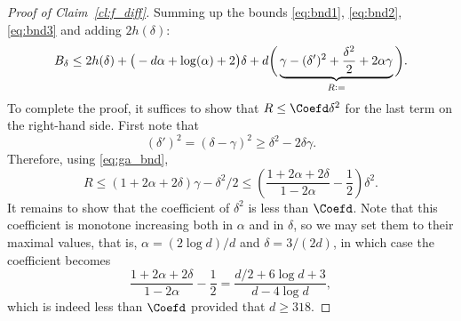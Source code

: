 \documentclass[12pt]{amsart}
\theoremstyle{definition}
\newcommand\al{\alpha}
\newcommand\ga{\gamma}
\newcommand\de{\delta}
\newcommand{\defeq}{\mathrel{\vcenter{\baselineskip0.5ex \lineskiplimit0pt
                     \hbox{\scriptsize.}\hbox{\scriptsize.}}}%
                     =}
\begin{document}
\begin{proof}[Proof of Claim~\ref{cl:f_diff}]
Summing up the bounds \eqref{eq:bnd1}, \eqref{eq:bnd2}, \eqref{eq:bnd3} and adding $2 h(\de)$:
%
\[ B_\de 
\leq 2 h(\de) 
+ \big( -d\al + \log(\al) + 2 \big) \de 
+ d\bigg( 
\underbrace{\ga -(\de')^2 + \frac{\de^2}{2} + 2\al\ga}_
{R \defeq} \bigg) .\]
%
To complete the proof, it suffices to show that $R \leq \Coefd \de^2$ for the last term on the right-hand side. First note that 
%
\[ (\de')^2 = (\de-\ga)^2 \geq \de^2 - 2\de \ga .\]
%
Therefore, using \eqref{eq:ga_bnd}, 
%
\[ R \leq (1+2\al+2\de) \ga - \de^2/2 
\leq \left( \frac{1+2\al+2\de}{1-2\al} 
- \frac{1}{2} \right) \de^2 .\]
%
It remains to show that the coefficient of $\de^2$ is less than $\Coefd$. Note that this coefficient is monotone increasing both in $\al$ and in $\de$, so we may set them to their maximal values, that is, $\al=(2 \log d)/d$ and $\de=3/(2d)$, in which case the coefficient becomes  
%
\[ \frac{1+2\al+2\de}{1-2\al} - \frac{1}{2} 
= \frac{d/2+6 \log d + 3}{d-4 \log d} ,\]
which is indeed less than $\Coefd$ provided that $d \geq 318$.
%
\end{proof}
%
\end{document}
